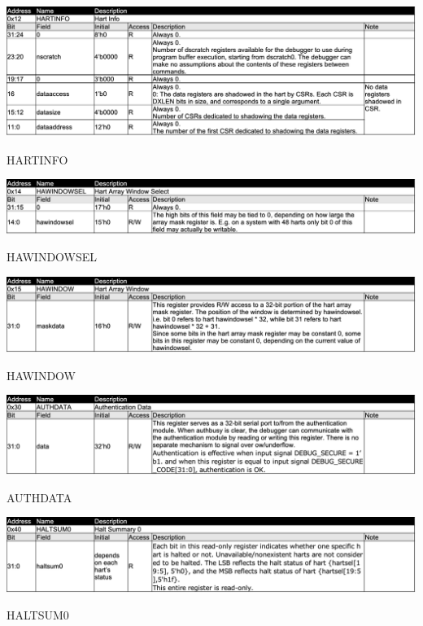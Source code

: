 \begin{table}[H]
    \includegraphics[width=1.00\columnwidth]{./Table/HARTINFO.png}
    \caption{HARTINFO}
    \label{tb:HARTINFO}
\end{table}

\begin{table}[H]
    \includegraphics[width=1.00\columnwidth]{./Table/HAWINDOWSEL.png}
    \caption{HAWINDOWSEL}
    \label{tb:HAWINDOWSEL}
\end{table}

\begin{table}[H]
    \includegraphics[width=1.00\columnwidth]{./Table/HAWINDOW.png}
    \caption{HAWINDOW}
    \label{tb:HAWINDOW}
\end{table}

\begin{table}[H]
    \includegraphics[width=1.00\columnwidth]{./Table/AUTHDATA.png}
    \caption{AUTHDATA}
    \label{tb:AUTHDATA}
\end{table}

\begin{table}[H]
    \includegraphics[width=1.00\columnwidth]{./Table/HALTSUM0.png}
    \caption{HALTSUM0}
    \label{tb:HALTSUM0}
\end{table}

